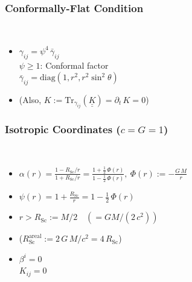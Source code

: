 \documentclass{beamer}
\newcommand{\p}{\partial}
\newcommand{\ul}{\underline}
\newcommand{\rsc}{R_{\mathrm{Sc}}}
\begin{document}
\begin{frame}
\frametitle{Conformally-Flat Condition}

  \citet{wmm1996,cc2009}\\[1em]

  \begin{itemize}[<+->]
    \item[]
      $\gamma_{ij}=\psi^{4}\,\bar{\gamma}_{ij}$\\[1em]
      $\psi\geq1$: Conformal factor\\[1em]
      $\bar{\gamma}_{ij}
      =\mathrm{diag}\left(1,r^{2},r^{2}\sin^{2}\theta\right)$\\[1em]
    \item[]
      (Also, $K:=\mathrm{Tr}_{\gamma_{ij}}\left(\ul{\ul{K}}\right)=\p_{t}\,K=0$)
  \end{itemize}

\end{frame}

\begin{frame}
\frametitle{Isotropic Coordinates ($c=G=1$)}

  \citet{bs2010}\\[1em]

  \begin{itemize}[<+->]
    \item[]
      $\alpha\left(r\right)=
      \frac{1-\rsc/r}{1+\rsc/r}
      =\frac{1+\frac{1}{2}\,\Phi\left(r\right)}
            {1-\frac{1}{2}\,\Phi\left(r\right)},
      \ \Phi\left(r\right):=-\frac{G\,M}{r}$\\[1em]
    \item[]
      $\psi\left(r\right)=
      1+\frac{\rsc}{r}=1-\frac{1}{2}\,\Phi\left(r\right)$\\[1em]
    \item[]
      $r>\rsc:=M/2\hspace{1em}\left(=GM/\left(2\,c^{2}\right)\right)$\\[1em]
    \item[]
      ($\rsc^{\mathrm{areal}}:=2\,G\,M/c^{2}=4\,\rsc$)\\[1em]
    \item[]
      $\beta^{i}=0$\\[1em]
      $K_{ij}=0$
  \end{itemize}

\end{frame}
\end{document}
